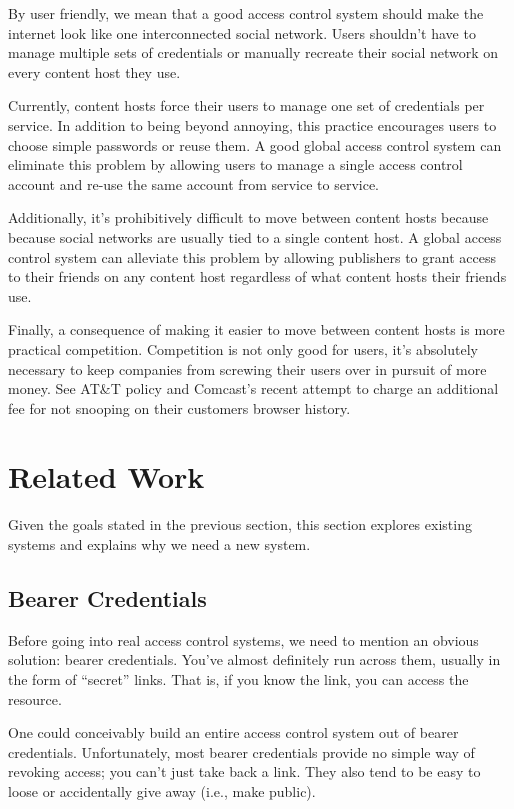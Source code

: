 \documentclass[pdftex,12pt,a4papaer]{report}
\begin{document}
By user friendly, we mean that a good access control system should make the
internet look like one interconnected social network. Users shouldn't have to
manage multiple sets of credentials or manually recreate their social network on
every content host they use.

Currently, content hosts force their users to manage one set of credentials
per service. In addition to being beyond annoying, this practice encourages
users to choose simple passwords or reuse them. A good global access control
system can eliminate this problem by allowing users to manage a single access
control account and re-use the same account from service to service.

Additionally, it's prohibitively difficult to move between content hosts because
because social networks are usually tied to a single content host. A global
access control system can alleviate this problem by allowing publishers to
grant access to their friends on any content host regardless of what content
hosts their friends use.

Finally, a consequence of making it easier to move between content hosts is
more practical competition. Competition is not only good for users, it's
absolutely necessary to keep companies from screwing their users over in pursuit
of more money. See AT\&T\texttrademark{}\cite{att} policy and
Comcast's\texttrademark{}\cite{comcast} recent attempt to charge an additional
fee for not snooping on their customers browser history.

\section{Related Work} 

Given the goals stated in the previous section, this section explores existing
systems and explains why we need a new system.

\subsection{Bearer Credentials}

Before going into real access control systems, we need to mention an obvious
solution: bearer credentials. You've almost definitely run across them, usually
in the form of ``secret'' links. That is, if you know the link, you can access
the resource.

One could conceivably build an entire access control system out of bearer
credentials. Unfortunately, most bearer credentials provide no simple way of
revoking access; you can't just take back a link. They also tend to be easy to
loose or accidentally give away (i.e., make public).
\end{document}
